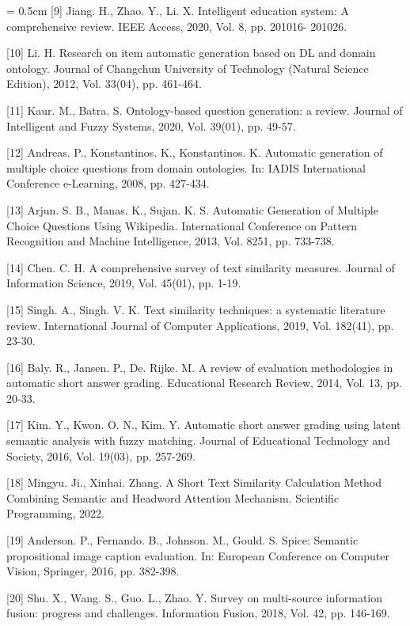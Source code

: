 \documentclass{article}
\begin{document}
\begin{multicols}{2}
\fontsize{9}{11}\selectfont
\leftskip = 0.5cm [9] Jiang. H., Zhao. Y., Li. X. Intelligent education system: A comprehensive review. IEEE Access, 2020, Vol. 8, pp. 201016- 201026.

[10] Li. H. Research on item automatic generation based on DL and domain ontology. Journal of Changchun University of Technology (Natural Science Edition), 2012, Vol. 33(04), pp. 461-464.

[11] Kaur. M., Batra. S. Ontology-based question generation: a review. Journal of Intelligent and Fuzzy Systems, 2020, Vol. 39(01), pp. 49-57.

[12] Andreas. P., Konstantinos. K., Konstantinos. K. Automatic generation of multiple choice questions from domain ontologies. In: IADIS International Conference e-Learning, 2008, pp. 427-434.

[13] Arjun. S. B., Manas. K., Sujan. K. S. Automatic Generation of Multiple Choice Questions Using Wikipedia. International Conference on Pattern Recognition and Machine Intelligence, 2013, Vol. 8251, pp. 733-738.

[14] Chen. C. H. A comprehensive survey of text similarity measures. Journal of Information Science, 2019, Vol. 45(01), pp. 1-19.

[15] Singh. A., Singh. V. K. Text similarity techniques: a systematic literature review. International Journal of Computer Applications, 2019, Vol. 182(41), pp. 23-30.

[16] Baly. R., Jansen. P., De. Rijke. M. A review of evaluation methodologies in automatic short answer grading. Educational Research Review, 2014, Vol. 13, pp. 20-33.

[17] Kim. Y., Kwon. O. N., Kim. Y. Automatic short answer grading using latent semantic analysis with fuzzy matching. Journal of Educational Technology and Society, 2016, Vol. 19(03), pp. 257-269.

[18] Mingyu. Ji., Xinhai. Zhang. A Short Text Similarity Calculation Method Combining Semantic and Headword Attention Mechanism. Scientific Programming, 2022.

[19] Anderson. P., Fernando. B., Johnson. M., Gould. S. Spice: Semantic propositional image caption evaluation. In: European Conference on Computer Vision, Springer, 2016, pp. 382-398.

[20] Shu. X., Wang. S., Guo. L., Zhao. Y. Survey on multi-source information fusion: progress and challenges. Information Fusion, 2018, Vol. 42, pp. 146-169.


\end{multicols}
\end{document}

